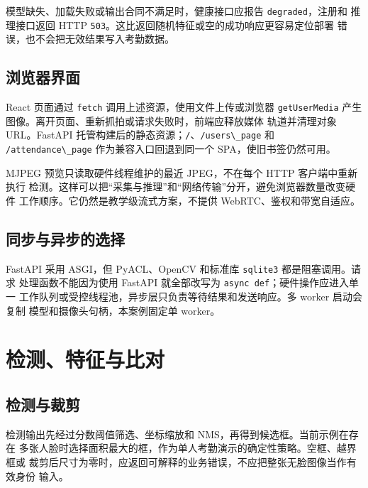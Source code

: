 模型缺失、加载失败或输出合同不满足时，健康接口应报告
\passthrough{\lstinline!degraded!}，注册和 推理接口返回 HTTP
\passthrough{\lstinline!503!}。这比返回随机特征或空的成功响应更容易定位部署
错误，也不会把无效结果写入考勤数据。

\subsection{浏览器界面}\label{ux6d4fux89c8ux5668ux754cux9762}

React 页面通过 \passthrough{\lstinline!fetch!}
调用上述资源，使用文件上传或浏览器
\passthrough{\lstinline!getUserMedia!}
产生图像。离开页面、重新抓拍或请求失败时，前端应释放媒体 轨道并清理对象
URL。FastAPI
托管构建后的静态资源；\passthrough{\lstinline!/!}、\passthrough{\lstinline!/users\_page!}
和 \passthrough{\lstinline!/attendance\_page!} 作为兼容入口回退到同一个
SPA，使旧书签仍然可用。

MJPEG 预览只读取硬件线程维护的最近 JPEG，不在每个 HTTP 客户端中重新执行
检测。这样可以把``采集与推理''和``网络传输''分开，避免浏览器数量改变硬件
工作顺序。它仍然是教学级流式方案，不提供 WebRTC、鉴权和带宽自适应。

\subsection{同步与异步的选择}\label{ux540cux6b65ux4e0eux5f02ux6b65ux7684ux9009ux62e9}

FastAPI 采用 ASGI，但 PyACL、OpenCV 和标准库
\passthrough{\lstinline!sqlite3!} 都是阻塞调用。请求
处理函数不能因为使用 FastAPI 就全部改写为
\passthrough{\lstinline!async def!}；硬件操作应进入单一
工作队列或受控线程池，异步层只负责等待结果和发送响应。多 worker
启动会复制 模型和摄像头句柄，本案例固定单 worker。

\section{检测、特征与比对}\label{ux68c0ux6d4bux7279ux5f81ux4e0eux6bd4ux5bf9}

\subsection{检测与裁剪}\label{ux68c0ux6d4bux4e0eux88c1ux526a}

检测输出先经过分数阈值筛选、坐标缩放和 NMS，再得到候选框。当前示例在存在
多张人脸时选择面积最大的框，作为单人考勤演示的确定性策略。空框、越界框或
裁剪后尺寸为零时，应返回可解释的业务错误，不应把整张无脸图像当作有效身份
输入。

